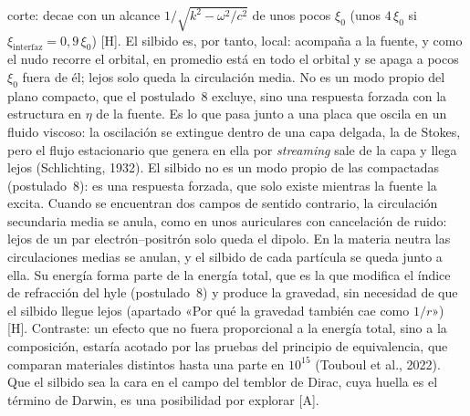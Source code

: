 \documentclass[11pt,a4paper]{article}
\newcommand{\st}[1]{\textup{[#1]}}
\begin{document}
corte: decae con un alcance $1/\sqrt{k^2-\omega^2/c^2}$ de unos pocos $\xi_0$ (unos $4\,\xi_0$ si $\xi_{\mathrm{interfaz}}=0{,}9\,\xi_0$) \st{H}. El silbido es, por tanto, local: acompaña a la fuente, y como el nudo recorre el orbital, en promedio está en todo el orbital y se apaga a pocos $\xi_0$ fuera de él; lejos solo queda la circulación media. No es un modo propio del plano compacto, que el postulado~8 excluye, sino una respuesta forzada con la estructura en $\eta$ de la fuente. Es lo que pasa junto a una placa que oscila en un fluido viscoso: la oscilación se extingue dentro de una capa delgada, la de Stokes, pero el flujo estacionario que genera en ella por \emph{streaming} sale de la capa y llega lejos (Schlichting, 1932). El silbido no es un modo propio de las compactadas (postulado~8): es una respuesta forzada, que solo existe mientras la fuente la excita. Cuando se encuentran dos campos de sentido contrario, la circulación secundaria media se anula, como en unos auriculares con cancelación de ruido: lejos de un par electrón--positrón solo queda el dipolo. En la materia neutra las circulaciones medias se anulan, y el silbido de cada partícula se queda junto a ella. Su energía forma parte de la energía total, que es la que modifica el índice de refracción del hyle (postulado~8) y produce la gravedad, sin necesidad de que el silbido llegue lejos (apartado «Por qué la gravedad también cae como $1/r$») \st{H}. Contraste: un efecto que no fuera proporcional a la energía total, sino a la composición, estaría acotado por las pruebas del principio de equivalencia, que comparan materiales distintos hasta una parte en $10^{15}$ (Touboul et al., 2022). Que el silbido sea la cara en el campo del temblor de Dirac, cuya huella es el término de Darwin, es una posibilidad por explorar \st{A}.
\end{document}
